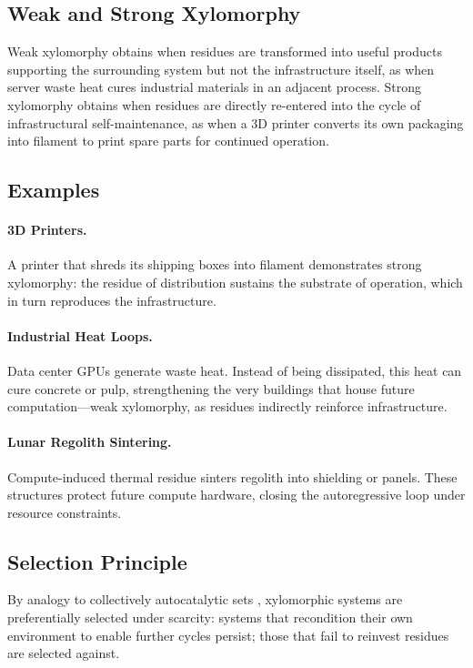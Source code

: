 \documentclass[11pt,a4paper]{article}
\theoremstyle{plain}
\theoremstyle{definition}
\theoremstyle{remark}
\begin{document}
\subsection{Weak and Strong Xylomorphy}

Weak xylomorphy obtains when residues are transformed into useful products
supporting the surrounding system but not the infrastructure itself, as when
server waste heat cures industrial materials in an adjacent process. Strong
xylomorphy obtains when residues are directly re-entered into the cycle of
infrastructural self-maintenance, as when a 3D printer converts its own
packaging into filament to print spare parts for continued operation.

\subsection{Examples}

\paragraph{3D Printers.}
A printer that shreds its shipping boxes into filament demonstrates strong
xylomorphy: the residue of distribution sustains the substrate of operation,
which in turn reproduces the infrastructure.

\paragraph{Industrial Heat Loops.}
Data center GPUs generate waste heat. Instead of being dissipated, this heat
can cure concrete or pulp, strengthening the very buildings that house future
computation---weak xylomorphy, as residues indirectly reinforce infrastructure.

\paragraph{Lunar Regolith Sintering.}
Compute-induced thermal residue sinters regolith into shielding or panels.
These structures protect future compute hardware, closing the autoregressive
loop under resource constraints.

\subsection{Selection Principle}

By analogy to collectively autocatalytic sets \citep{kauffman1993}, xylomorphic
systems are preferentially selected under scarcity: systems that recondition
their own environment to enable further cycles persist; those that fail to
reinvest residues are selected against.
\end{document}
